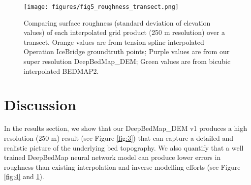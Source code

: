 \documentclass[tc, manuscript]{copernicus}
\begin{document}
\begin{figure*}[ht]
  \centering
  \qquad
  \caption{
    Spatial 2D view of grids over Thwaites Glacier, West Antarctica.
    Plotted on an Antarctic Stereographic Projection (EPSG:3031) with elevation and standard deviation values in metres referenced to the WGS84 datum.
    Orange groundtruth points in \textbf{a} correspond to transect sampling locations used in Figure \ref{fig:5}.
    Note that color scale of \textbf{b} and \textbf{c} is twice that of \textbf{d}.
  }
  \label{fig:4}
\end{figure*}

\begin{figure}[ht]
    \texttt{[image: figures/fig5\_roughness\_transect.png]}
    \caption{
      Comparing surface roughness (standard deviation of elevation values) of each interpolated grid product (250 m resolution) over a transect.
      Orange values are from tension spline interpolated Operation IceBridge groundtruth points;
      Purple values are from our super resolution DeepBedMap\_DEM;
      Green values are from bicubic interpolated BEDMAP2.
    }
    \label{fig:5}
\end{figure}


\section{Discussion}

In the results section, we show that our DeepBedMap\_DEM v1 produces a high resolution (250 m) result (see Figure \ref{fig:3}) that can capture a detailed and realistic picture of the underlying bed topography.
We also quantify that a well trained DeepBedMap neural network model can produce lower errors in roughness than existing interpolation and inverse modelling efforts (see Figure \ref{fig:4} and \ref{fig:5}).
\end{document}

